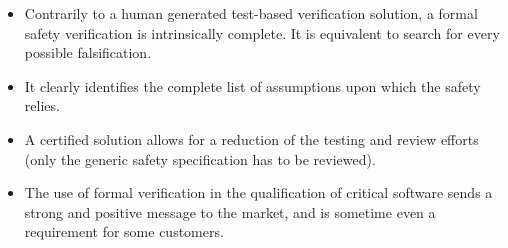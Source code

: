 \begin{itemize}
\item Contrarily to a human generated test-based verification solution, a formal safety verification is
intrinsically complete. It is equivalent to search for every possible falsification.
\item It clearly identifies the complete list of assumptions upon which the safety relies.
\item A certified solution allows for a reduction of the testing and review efforts (only the generic safety
specification has to be reviewed).
\item The use of formal verification in the qualification of critical software sends a strong
and positive message to the market, and is sometime even a requirement for some customers.
\end{itemize}


